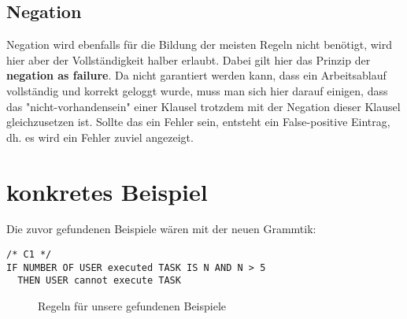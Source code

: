 \subsection{Negation}
Negation wird ebenfalls für die Bildung der meisten Regeln nicht benötigt, wird hier aber der Vollständigkeit halber erlaubt. Dabei gilt hier das Prinzip der \textbf{negation as failure}. Da nicht garantiert werden kann, dass ein Arbeitsablauf vollständig und korrekt geloggt wurde, muss man sich hier darauf einigen, dass das "nicht-vorhandensein" einer Klausel trotzdem mit der Negation dieser Klausel gleichzusetzen ist. Sollte das ein Fehler sein, entsteht ein False-positive Eintrag, dh. es wird ein Fehler zuviel angezeigt.



%
%
\section{konkretes Beispiel}
Die zuvor gefundenen Beispiele wären mit der neuen Grammtik:\\
\begin{verbatim}
/* C1 */
IF NUMBER OF USER executed TASK IS N AND N > 5
  THEN USER cannot execute TASK
\end{verbatim}
\begin{figure}[!h]
\caption{Regeln für unsere gefundenen Beispiele}
\label{fig:resultrulefile}
\end{figure}
